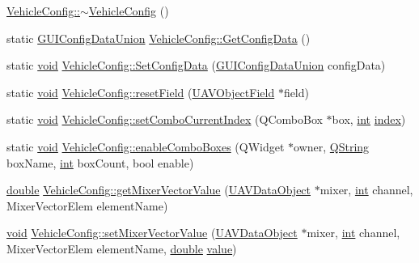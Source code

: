 \begin{DoxyCompactItemize}
\item 
\hyperlink{group___config_plugin_ga440451fa05e53fc37b5dfafc439cd681}{Vehicle\-Config\-::$\sim$\-Vehicle\-Config} ()
\item 
static \hyperlink{union_g_u_i_config_data_union}{G\-U\-I\-Config\-Data\-Union} \hyperlink{group___config_plugin_gae2c0e1bb819f6b9c95402cea8702e177}{Vehicle\-Config\-::\-Get\-Config\-Data} ()
\item 
static \hyperlink{group___u_a_v_objects_plugin_ga444cf2ff3f0ecbe028adce838d373f5c}{void} \hyperlink{group___config_plugin_ga0a6981811a5b0f3c144bde081c414da0}{Vehicle\-Config\-::\-Set\-Config\-Data} (\hyperlink{union_g_u_i_config_data_union}{G\-U\-I\-Config\-Data\-Union} config\-Data)
\item 
static \hyperlink{group___u_a_v_objects_plugin_ga444cf2ff3f0ecbe028adce838d373f5c}{void} \hyperlink{group___config_plugin_ga5d58a26e503e6a3d9a565932148036ce}{Vehicle\-Config\-::reset\-Field} (\hyperlink{class_u_a_v_object_field}{U\-A\-V\-Object\-Field} $\ast$field)
\item 
static \hyperlink{group___u_a_v_objects_plugin_ga444cf2ff3f0ecbe028adce838d373f5c}{void} \hyperlink{group___config_plugin_ga56c01e65c75f32c462e8a5191fabffce}{Vehicle\-Config\-::set\-Combo\-Current\-Index} (Q\-Combo\-Box $\ast$box, \hyperlink{ioapi_8h_a787fa3cf048117ba7123753c1e74fcd6}{int} \hyperlink{glext_8h_ab47dd9958bcadea08866b42bf358e95e}{index})
\item 
static \hyperlink{group___u_a_v_objects_plugin_ga444cf2ff3f0ecbe028adce838d373f5c}{void} \hyperlink{group___config_plugin_ga80929dea8a5f354f9d7df8162e027b29}{Vehicle\-Config\-::enable\-Combo\-Boxes} (Q\-Widget $\ast$owner, \hyperlink{group___u_a_v_objects_plugin_gab9d252f49c333c94a72f97ce3105a32d}{Q\-String} box\-Name, \hyperlink{ioapi_8h_a787fa3cf048117ba7123753c1e74fcd6}{int} box\-Count, bool enable)
\item 
\hyperlink{_super_l_u_support_8h_a8956b2b9f49bf918deed98379d159ca7}{double} \hyperlink{group___config_plugin_ga0d65103b0dfd7aa3d3fca584cdda0a3f}{Vehicle\-Config\-::get\-Mixer\-Vector\-Value} (\hyperlink{class_u_a_v_data_object}{U\-A\-V\-Data\-Object} $\ast$mixer, \hyperlink{ioapi_8h_a787fa3cf048117ba7123753c1e74fcd6}{int} channel, Mixer\-Vector\-Elem element\-Name)
\item 
\hyperlink{group___u_a_v_objects_plugin_ga444cf2ff3f0ecbe028adce838d373f5c}{void} \hyperlink{group___config_plugin_ga1c43f32f9f928991460ed7491d048ca1}{Vehicle\-Config\-::set\-Mixer\-Vector\-Value} (\hyperlink{class_u_a_v_data_object}{U\-A\-V\-Data\-Object} $\ast$mixer, \hyperlink{ioapi_8h_a787fa3cf048117ba7123753c1e74fcd6}{int} channel, Mixer\-Vector\-Elem element\-Name, \hyperlink{_super_l_u_support_8h_a8956b2b9f49bf918deed98379d159ca7}{double} \hyperlink{glext_8h_aa0e2e9cea7f208d28acda0480144beb0}{value})

\end{DoxyCompactItemize}
